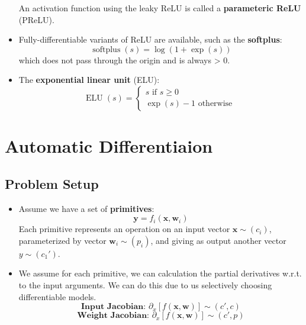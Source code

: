 \documentclass{article}
\newcommand{\tbf}[1]{\textbf{#1}}
\newcommand{\mbf}[1]{\mathbf{#1}}
\begin{document}
\begin{itemize}
            An activation function using the leaky ReLU is called a \tbf{parameteric ReLU} (PReLU). 
            \item Fully-differentiable variants of ReLU are available, such as the \tbf{softplus}:
            \[\operatorname{softplus}(s) = \operatorname{log}(1+\operatorname{exp}(s))\]
            which does not pass through the origin and is always > 0.
            \item The \tbf{exponential linear unit} (ELU):
            \[\operatorname{ELU}(s) = 
            \begin{cases}
                s \text{ if } s \geq 0 \\
                \operatorname{exp}(s) - 1 \text{ otherwise }
            \end{cases}\]
        \end{itemize}
        \section{Automatic Differentiaion}
        \subsection{Problem Setup}
        \begin{itemize}
            \item Assume we have a set of \tbf{primitives}:
            \[\mbf{y} = f_i(\mbf{x}, \mbf{w}_i)\]
            Each primitive represents an operation on an input vector $\mbf{x} \sim (c_i)$, parameterized by vector $\mbf{w}_i \sim (p_i)$, and giving as output another vector $y \sim (c_1')$.
            \item We assume for each primitive, we can calculation the partial derivatives w.r.t. to the input arguments. We can do this due to us selectively choosing differentiable models.
            \[\tbf{Input Jacobian: } \partial _x[f(\mbf{x}, \mbf{w})] \sim (c',c)\] 
            \[\tbf{Weight Jacobian: } \partial _x[f(\mbf{x}, \mbf{w})] \sim (c',p)\]
        \end{itemize}
\end{document}
